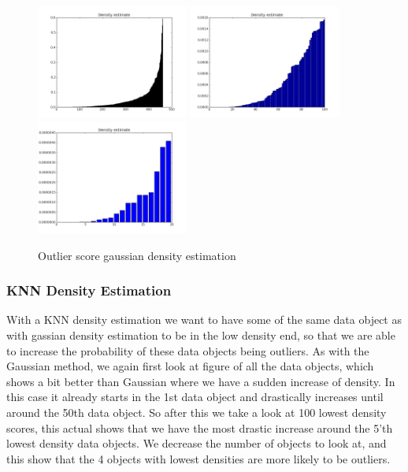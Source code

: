 \begin{figure}[H]
\centering
\includegraphics[width=5cm, keepaspectratio=true]{pictures/densityEstimationAll.png}
\includegraphics[width=5cm, keepaspectratio=true]{pictures/densityEstimation100.png}
\includegraphics[width=5cm, keepaspectratio=true]{pictures/densityEstimation20.png}
\vspace{-0.4cm}
\caption{\footnotesize Outlier score gaussian density estimation}
\label{gkd}
\end{figure}

\subsubsection{KNN Density Estimation}

With a KNN density estimation we want to have some of the same data object as with gassian density estimation to be in the low density end, so that we are able to increase the probability of these data objects being outliers. As with the Gaussian method, we again first look at figure of all the data objects, which shows a bit better than Gaussian where we have a sudden increase of density. In this case it already starts in the 1st data object and drastically increases until around the 50th data object. So after this we take a look at 100 lowest density scores, this actual shows that we have the most drastic increase around the 5'th lowest density data objects. We decrease the number of objects to look at, and this show that the 4 objects with lowest densities are more likely to be outliers.

